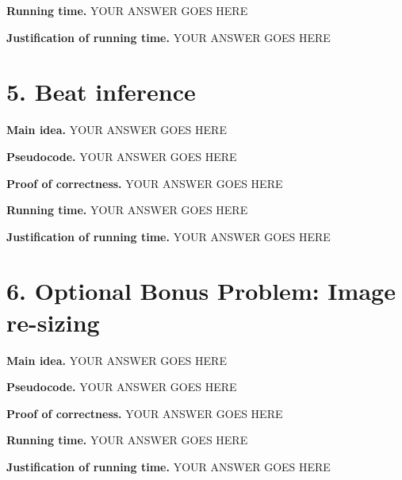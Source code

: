 \documentclass[11pt]{article}
\begin{document}
\noindent
\textbf{Running time.}
YOUR ANSWER GOES HERE


\noindent
\textbf{Justification of running time.}
YOUR ANSWER GOES HERE


\newpage
\section*{5. Beat inference}
\noindent
\textbf{Main idea.}
YOUR ANSWER GOES HERE


\noindent
\textbf{Pseudocode.}
YOUR ANSWER GOES HERE

\noindent
\textbf{Proof of correctness.}
YOUR ANSWER GOES HERE


\noindent
\textbf{Running time.}
YOUR ANSWER GOES HERE


\noindent
\textbf{Justification of running time.}
YOUR ANSWER GOES HERE


\newpage
\section*{6. Optional Bonus Problem: Image re-sizing}
\noindent
\textbf{Main idea.}
YOUR ANSWER GOES HERE


\noindent
\textbf{Pseudocode.}
YOUR ANSWER GOES HERE

\noindent
\textbf{Proof of correctness.}
YOUR ANSWER GOES HERE


\noindent
\textbf{Running time.}
YOUR ANSWER GOES HERE


\noindent
\textbf{Justification of running time.}
YOUR ANSWER GOES HERE
\end{document}
